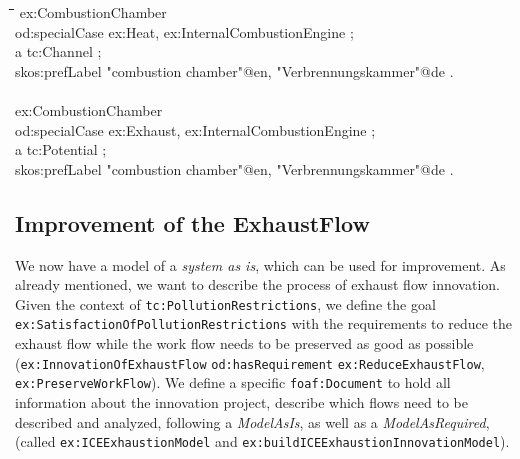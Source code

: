 \documentclass[a4paper,11pt]{article}
\newenvironment{code}{\tt \begin{tabbing}
\hskip12pt\=\hskip12pt\=\hskip12pt\=\hskip12pt\=\hskip5cm\=\hskip5cm\=\kill}
{\end{tabbing}}
\begin{document}
\begin{itemize}
    \begin{code}
    ex:CombustionChamber \\
    \> od:specialCase ex:Heat, ex:InternalCombustionEngine ; \\
    \> a tc:Channel ; \\
    \> skos:prefLabel "combustion chamber"@en, "Verbrennungskammer"@de . \\
    \\
    ex:CombustionChamber \\
    \> od:specialCase ex:Exhaust, ex:InternalCombustionEngine ; \\
    \> a tc:Potential ; \\
    \> skos:prefLabel "combustion chamber"@en, "Verbrennungskammer"@de . \\
    \end{code}

    \subsection{Improvement of the ExhaustFlow}
    We now have a model of a \emph{system as is}, which can be used for
    improvement. As already mentioned, we want to describe the process 
    of exhaust flow innovation. Given the context of 
    \texttt{tc:PollutionRestrictions}, 
    we define the goal \texttt{ex:SatisfactionOfPollutionRestrictions} with the
    requirements to reduce the exhaust flow while the work flow needs to be 
    preserved as good as possible (\texttt{ex:InnovationOfExhaustFlow} 
    \texttt{od:hasRequirement} \texttt{ex:ReduceExhaustFlow}, 
    \texttt{ex:PreserveWorkFlow}). We define a specific
    \texttt{foaf:Document} to hold all information about the innovation
    project, describe which flows need to be described and analyzed,
    following a \emph{ModelAsIs}, as well as a \emph{ModelAsRequired},
    (called \texttt{ex:ICEExhaustionModel} and \newline
    \texttt{ex:buildICEExhaustionInnovationModel}).


\end{itemize}
\end{document}
